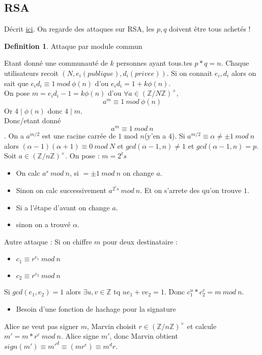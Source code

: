 \documentclass[12pt]{article}
\theoremstyle{plain}
\theoremstyle{definition}
\newtheorem{defn}[subsubsection]{Definition}
\newcommand{\Z}{\mathbb{Z}}
\begin{document}
\subsection{RSA}
Décrit \href{https://en.wikipedia.org/wiki/RSA_(cryptosystem)}{ici}. On
regarde des attaques sur RSA, les $p,q$ doivent être tous achetés ! 
\begin{defn}
    Attaque par module commun 
\end{defn}
Etant donné une communauté de $k$ personnes ayant tous.tes $p*q=n$. 
    Chaque utilisateurs recoit $(N, e_i(publique), d_i(privee))$. Si on connait $e_i,d_i$ alors 
    on sait que $e_id_i\equiv 1~mod~\phi(n)$ d'ou $e_id_i=1+k\phi(n)$. \\
    On pose $m=e_id_i-1=k\phi(n)$ d'ou $\forall a\in (\Z/N\Z)^{\times}$,$$a^m\equiv 1~mod~\phi(n)$$
    Or $4\mid \phi(n)$ donc $4\mid m$. \\
    Donc/etant donné $$a^m\equiv 1~mod~n$$.
    On a $a^{m/2}$ est une racine carrée de $1$ mod $n$(y'en a $4$). Si $a^{m/2}\equiv\alpha\neq \pm 1~mod~n$ 
    alors $(\alpha-1)(\alpha+1)\equiv 0~mod~N$ et $gcd(\alpha-1, n)\neq 1$ et 
    $gcd(\alpha-1, n)=p$. Soit $a\in (\Z/n\Z)^{\times}$. On pose : $m=2^ts$
    \begin{itemize}
        \item On calc $a^s~mod~n$, si $=\pm 1~mod~n$ on change $a$.
        \item Sinon on calc successivement $a^{2^is}~mod~n$. Et on s'arrete
        des qu'on trouve $1$.
        \item Si a l'étape d'avant on change $a$.
        \item sinon on a trouvé $\alpha$.
    \end{itemize}
Autre attaque : Si on chiffre $m$ pour deux destinataire : 
\begin{itemize}
    \item $c_1\equiv r^{e_1}~mod~n$
    \item $c_2\equiv r^{e_2}~mod~n$
\end{itemize}
Si $gcd(e_1,e_2)=1$ alors $\exists u,v\in\Z$ tq $ue_1+ve_2=1$. Donc
$c_1^u*c_2^v=m~mod~n$.\\

\begin{itemize}
    \item Besoin d'une fonction de hachage pour la signature
\end{itemize}

Alice ne veut pas signer $m$, Marvin choisit $r\in(\Z/n\Z)^{\times}$ et calcule
$m'=m*r^e~mod~n$. Alice signe $m'$, donc Marvin obtient $sign(m')\equiv m'^d\equiv (mr^e)\equiv m^dr$.\\
\end{document}

